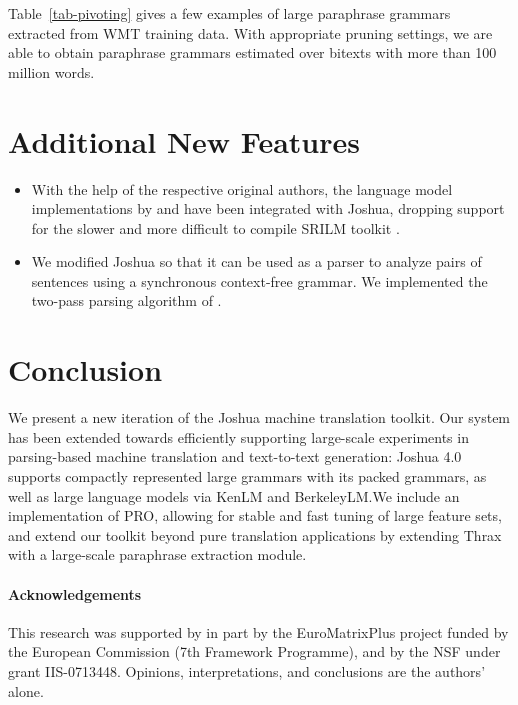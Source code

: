 \documentclass[11pt]{article}
\begin{document}
Table~\ref{tab-pivoting} gives a few examples of large paraphrase
grammars extracted from WMT training data. With appropriate pruning
settings, we are able to obtain paraphrase grammars estimated over
bitexts with more than 100 million words.

\section{Additional New Features}
\begin{itemize}
\item With the help of the respective original authors, the language
  model implementations by  and 
  have been integrated with Joshua, dropping support for the slower
  and more difficult to compile SRILM toolkit \cite{SRILM}.
\item We modified Joshua so that it can be used as a parser to analyze
  pairs of sentences using a synchronous context-free grammar. We
  implemented the two-pass parsing algorithm of .
\end{itemize}

\section{Conclusion}

We present a new iteration of the Joshua machine translation
toolkit. Our system has been extended towards efficiently supporting
large-scale experiments in parsing-based machine translation and
text-to-text generation: Joshua 4.0 supports compactly represented
large grammars with its packed grammars, as well as large language
models via KenLM and BerkeleyLM.We include an implementation of PRO,
allowing for stable and fast tuning of large feature sets, and extend
our toolkit beyond pure translation applications by extending Thrax
with a large-scale paraphrase extraction module.

\paragraph{Acknowledgements}

This research was supported by in part by the EuroMatrixPlus project
funded by the European Commission (7th Framework Programme), and by
the NSF under grant IIS-0713448. Opinions, interpretations, and
conclusions are the authors' alone.



\end{document}
